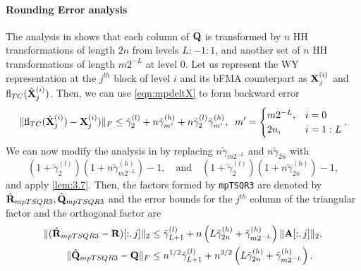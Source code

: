 \paragraph{Rounding Error analysis} The analysis in \cite{Mori2012} shows that each column of $\mathbf{Q}$ is transformed by $n$ HH transformations of length $2n$ from levels $L:-1:1$, and another set of $n$ HH transformations of length $m2^{-L}$ at level $0$.
Let us represent the WY representation at the $j^{th}$ block of level $i$ and its bFMA counterpart as $\mathbf{X}_j^{(i)}$ and $\mathrm{fl}_{TC}(\hat{\mathbf{X}}_j^{(i)})$.
Then, we can use \cref{eqn:mpdeltX} to form backward error  
\begin{equation}
	\|\mathrm{fl}_{TC}(\hat{\mathbf{X}}_j^{(i)})-\mathbf{X}_j^{(i)})\|_F \leq \tilde{\gamma}_2^{(l)} +n\tilde{\gamma}_{m'}^{(h)} + n\tilde{\gamma}_2^{(l)}\tilde{\gamma}_{m'}^{(h)}, \;\; m' = \begin{cases}
	m2^{-L}, &i=0\\
	2n, & i = 1 : L
	\end{cases}.
\end{equation}
We can now modify the analysis in \cite{Mori2012} by replacing $n\tilde{\gamma}_{m2^{-L}}$ and $n\tilde{\gamma}_{2n}$ with \[(1+\tilde{\gamma}_2^{(l)})(1+n\tilde{\gamma}_{m2^{-L}}^{(h)})-1,\quad\text{and}\quad (1+\tilde{\gamma}_2^{(l)})(1+n\tilde{\gamma}_{2n}^{(h)})-1,\]
and apply \cref{lem:3.7}.
Then, the factors formed by {\tt mpTSQR3} are denoted by $\hat{\mathbf{R}}_{mpTSQR3},\hat{\mathbf{Q}}_{mpTSQR3}$ and the error bounds for the $j^{th}$ column of the triangular factor and the orthogonal factor are
\begin{align*}
\|(\hat{\bb{R}}_{mpTSQR3}- \bb{R})[:,j]\|_2 &\leq \tilde{\gamma}_{L+1}^{(l)}+n\left(L\tilde{\gamma}_{2n}^{(h)}+\tilde{\gamma}_{m2^{-L}}^{(h)}\right)\|\bb{A}[:,j]\|_2\label{eqn:mpTSQR1},\\
	\|\hat{\bb{Q}}_{mpTSQR3} - \bb{Q}\|_F &\leq n^{1/2}\tilde{\gamma}_{L+1}^{(l)}+n^{3/2}\left(L\tilde{\gamma}_{2n}^{(h)}+\tilde{\gamma}_{m2^{-L}}^{(h)}\right).
\end{align*}
